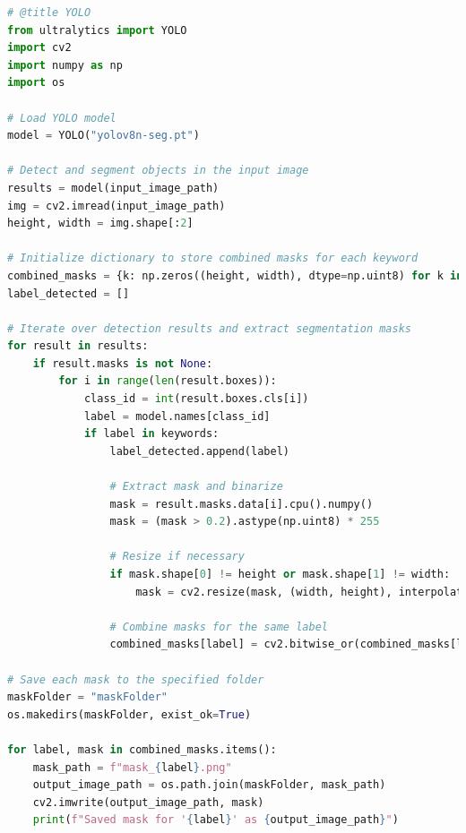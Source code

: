\documentclass[11pt,letterpaper]{article}
\begin{document}
\begin{lstlisting}[language=Python, caption={Code for Object detection and mask generation}, label={lst:mask_processing}]
# @title YOLO
from ultralytics import YOLO
import cv2
import numpy as np
import os

# Load YOLO model
model = YOLO("yolov8n-seg.pt")

# Detect and segment objects in the input image
results = model(input_image_path)
img = cv2.imread(input_image_path)
height, width = img.shape[:2]

# Initialize dictionary to store combined masks for each keyword
combined_masks = {k: np.zeros((height, width), dtype=np.uint8) for k in keywords}
label_detected = []

# Iterate over detection results and extract segmentation masks
for result in results:
    if result.masks is not None:
        for i in range(len(result.boxes)):
            class_id = int(result.boxes.cls[i])
            label = model.names[class_id]
            if label in keywords:
                label_detected.append(label)
                
                # Extract mask and binarize
                mask = result.masks.data[i].cpu().numpy()
                mask = (mask > 0.2).astype(np.uint8) * 255
                
                # Resize if necessary
                if mask.shape[0] != height or mask.shape[1] != width:
                    mask = cv2.resize(mask, (width, height), interpolation=cv2.INTER_NEAREST)
                
                # Combine masks for the same label
                combined_masks[label] = cv2.bitwise_or(combined_masks[label], mask)

# Save each mask to the specified folder
maskFolder = "maskFolder"
os.makedirs(maskFolder, exist_ok=True)

for label, mask in combined_masks.items():
    mask_path = f"mask_{label}.png"
    output_image_path = os.path.join(maskFolder, mask_path)
    cv2.imwrite(output_image_path, mask)
    print(f"Saved mask for '{label}' as {output_image_path}")
\end{lstlisting}
\end{document}
